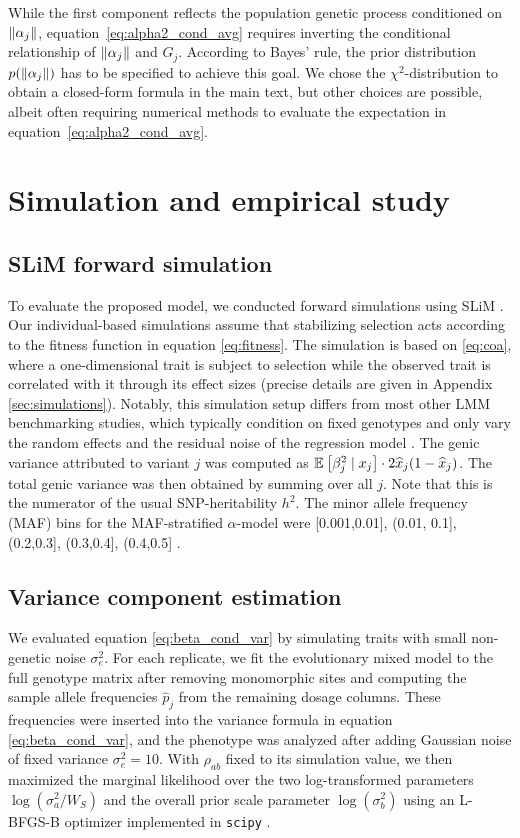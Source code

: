 \documentclass[10pt]{article}
\begin{document}
While the first component reflects the population genetic process conditioned on $\left\| \alpha_j \right\|$,
equation~\eqref{eq:alpha2_cond_avg} requires inverting the conditional relationship of $\left\| \alpha_j \right\|$ and $G_j$.
According to Bayes' rule,
the prior distribution $p(\left\| \alpha_j \right\|)$ has to be specified to achieve this goal.
We chose the $\chi^2$-distribution to obtain a closed-form formula in the main text,
but other choices are possible, albeit often requiring numerical methods to evaluate the expectation in equation~\eqref{eq:alpha2_cond_avg}.


\section{Simulation and empirical study}

\subsection{SLiM forward simulation}
To evaluate the proposed model, we conducted forward simulations using SLiM \citep{Haller_2025}. Our individual-based simulations assume that stabilizing selection acts according to the fitness function in equation \eqref{eq:fitness}.
The simulation is based on \eqref{eq:coa}, where a one-dimensional trait is subject to selection while the observed trait is correlated with it through its effect sizes (precise details are given in Appendix \ref{sec:simulations}).
Notably, this simulation setup differs from most other LMM benchmarking studies, which typically condition on fixed genotypes and only vary the random effects and the residual noise of the regression model \citep{Speed2017, Gazal_2019, Priv__2020}.
The genic variance attributed to variant $j$ was computed as $\mathbb{E}_{}\left[\beta_j^2 \mid x_j\right] \cdot 2\widehat{x}_j(1-\widehat{x}_j)$.
The total genic variance was then obtained by summing over all $j$.
Note that this is the numerator of the usual SNP-heritability $h^2$.
The minor allele frequency (MAF) bins for the MAF-stratified $\alpha$-model were [0.001,0.01], (0.01, 0.1], (0.2,0.3], (0.3,0.4], (0.4,0.5] \citep{Lee_2013}.


\subsection{Variance component estimation}

We evaluated equation \eqref{eq:beta_cond_var} by simulating traits with small non-genetic noise $\sigma_e^2$.
For each replicate, we fit the evolutionary mixed model to the full genotype matrix after removing monomorphic sites and computing the sample allele frequencies $\hat p_j$ from the remaining dosage columns. These frequencies were inserted into the variance formula in equation \eqref{eq:beta_cond_var}, and the phenotype was analyzed after adding Gaussian noise of fixed variance $\sigma_e^2=10$. With $\rho_{ab}$ fixed to its simulation value, we then maximized the marginal likelihood over the two log-transformed parameters $\log(\sigma_a^2/W_S)$ and the overall prior scale parameter $\log(\sigma_b^2)$ using an L-BFGS-B optimizer implemented in \texttt{scipy} \citep{Virtanen2020}.
\end{document}
